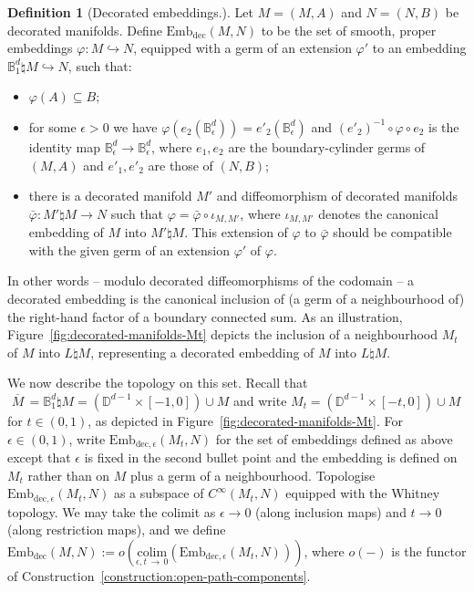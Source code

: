 \documentclass[10pt,a4paper]{amsart}
\numberwithin{equation}{section}
\newcommand{\colim}{\mathrm{colim}}
\newcommand{\rdec}{\mathrm{dec}}
\newcommand{\mbar}{\ensuremath{{\,\,\overline{\!\! M\!}\,}}}
\newcommand{\bB}{\mathbb{B}}
\newcommand{\bD}{\mathbb{D}}
\newcommand{\embdec}{\ensuremath{\mathrm{Emb}_{\rdec}}}
\newcommand{\embdece}{\ensuremath{\mathrm{Emb}_{\rdec,\epsilon}}}
\theoremstyle{definition}
\newtheorem{defi}[theo]{Definition}
\theoremstyle{remark}
\begin{document}
\begin{defi}[Decorated embeddings.]\label{def:embdec}
Let $M = (M,A)$ and $N = (N,B)$ be decorated manifolds. Define $\embdec(M,N)$ to be the set of smooth, proper embeddings $\varphi \colon M \hookrightarrow N$, equipped with a germ of an extension $\varphi'$ to an embedding $\bB_{1}^d \natural M \hookrightarrow N$, such that:
\begin{itemize}
\item $\varphi(A) \subseteq B$;
\item for some $\epsilon > 0$ we have $\varphi(e_{2}(\bB_{\epsilon}^d)) = e'_{2}(\bB_{\epsilon}^d)$ and $(e'_{2})^{-1} \circ \varphi \circ e_{2}$ is the identity map $\bB_{\epsilon}^d \to \bB_{\epsilon}^d$, where $e_{1},e_{2}$ are the boundary-cylinder germs of $(M,A)$ and $e'_{1},e'_{2}$ are those of $(N,B)$;
\item there is a decorated manifold $M'$ and diffeomorphism of decorated manifolds $\bar{\varphi} \colon M' \natural M \to N$ such that $\varphi = \bar{\varphi} \circ \iota_{M,M'}$, where $\iota_{M,M'}$ denotes the canonical embedding of $M$ into $M' \natural M$. This extension of $\varphi$ to $\bar{\varphi}$ should be compatible with the given germ of an extension $\varphi'$ of $\varphi$.
\end{itemize}
In other words -- modulo decorated diffeomorphisms of the codomain -- a decorated embedding is the canonical inclusion of (a germ of a neighbourhood of) the right-hand factor of a boundary connected sum. As an illustration, Figure~\ref{fig:decorated-manifolds-Mt} depicts the inclusion of a neighbourhood $M_t$ of $M$ into $L\natural M$, representing a decorated embedding of $M$ into $L\natural M$.

We now describe the topology on this set. Recall that $\mbar = \bB^d_1 \natural M = (\bD^{d-1} \times [-1,0]) \cup M$ and write $M_t = (\bD^{d-1} \times [-t,0]) \cup M$ for $t \in (0,1)$, as depicted in Figure~\ref{fig:decorated-manifolds-Mt}. For $\epsilon \in (0,1)$, write $\embdece(M_t,N)$ for the set of embeddings defined as above except that $\epsilon$ is fixed in the second bullet point and the embedding is defined on $M_t$ rather than on $M$ plus a germ of a neighbourhood. Topologise $\embdece(M_t,N)$ as a subspace of $C^\infty(M_t,N)$ equipped with the Whitney topology. We may take the colimit as $\epsilon \to 0$ (along inclusion maps) and $t \to 0$ (along restriction maps), and we define $\embdec(M,N) := o(\underset{\epsilon,t\,\to\,0}{\colim}(\embdece(M_t,N)))$, where $o(-)$ is the functor of Construction~\ref{construction:open-path-components}.
\end{defi}
\end{document}
